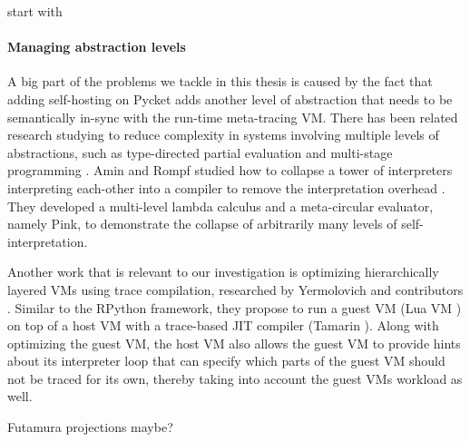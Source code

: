         \begin{paragraph-here}%
            start with \paragraph{Managing abstraction levels}

            A big part of the problems we tackle in this thesis is caused by the
            fact that adding self-hosting on Pycket adds another level of
            abstraction that needs to be semantically in-sync with the run-time
            meta-tracing VM. There has been related research studying to reduce
            complexity in systems involving multiple levels of abstractions, such
            as type-directed partial evaluation \cite{tdpe:99} and multi-stage
            programming \cite{multi-stage:17}. Amin and Rompf studied how to
            collapse a tower of interpreters interpreting each-other into a
            compiler to remove the interpretation overhead
            \cite{collapse:17}. They developed a multi-level lambda calculus and a
            meta-circular evaluator, namely Pink, to demonstrate the collapse of
            arbitrarily many levels of self-interpretation.

            Another work that is relevant to our investigation is optimizing
            hierarchically layered VMs using trace compilation, researched by
            Yermolovich and contributors \cite{layering:09}. Similar to the
            RPython framework, they propose to run a guest VM (Lua VM
            \cite{LuaJITLanguageToolkit}) on top of a host VM with a trace-based JIT compiler
            (Tamarin \cite{tamarin}). Along with optimizing the guest VM, the host
            VM also allows the guest VM to provide hints about its interpreter
            loop that can specify which parts of the guest VM should not be traced
            for its own, thereby taking into account the guest VMs workload as
            well.

            Futamura projections maybe?
        \end{paragraph-here}

